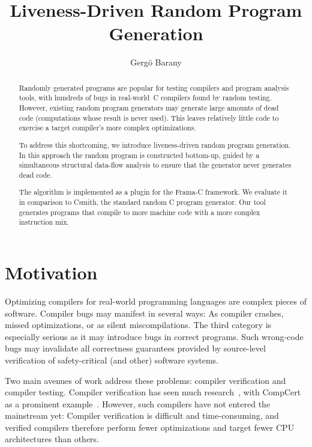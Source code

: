 \documentclass{llncs}
\title{Liveness-Driven Random Program Generation}
\author{Gergö Barany}
\institute{Inria Paris, France \\
           \email{gergo.barany@inria.fr}}
\begin{document}
\maketitle
\thispagestyle{plain}

\begin{abstract}
Randomly generated programs are popular for testing compilers and program
analysis tools, with hundreds of bugs in real-world~C compilers found by
random testing. However, existing random program generators may generate
large amounts of dead code (computations whose result is never used). This
leaves relatively little code to exercise a target compiler's more complex
optimizations.

To address this shortcoming, we introduce liveness-driven random program
generation. In this approach the random program is constructed bottom-up,
guided by a simultaneous structural data-flow analysis to ensure that the
generator never generates dead code.

The algorithm is implemented as a plugin for the Frama-C framework. We
evaluate it in comparison to Csmith, the standard random C program
generator. Our tool generates programs that compile to more machine code
with a more complex instruction mix.
\end{abstract}



\section{Motivation}

Optimizing compilers for real-world programming languages are complex pieces
of software. Compiler bugs may manifest in several ways: As compiler
crashes, missed optimizations, or as silent miscompilations. The third
category is especially serious as it may introduce bugs in correct programs.
Such wrong-code bugs may invalidate all correctness guarantees provided by
source-level verification of safety-critical (and other) software systems.

Two main avenues of work address these problems: compiler verification and
compiler testing. Compiler verification has seen much
research~\cite{dave-2003}, with Comp\-Cert as a prominent
example~\cite{leroy-2009}. However, such compilers have not entered the
mainstream yet: Compiler verification is difficult and time-consuming, and
verified compilers therefore perform fewer optimizations and target fewer
CPU architectures than others.
\end{document}
